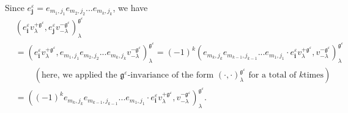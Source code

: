 \documentclass[etingof-lie.tex]{subfiles}
\begin{document}
Since $e_{\mathbf{j}}^{\varepsilon}=e_{m_{1},j_{1}}e_{m_{2},j_{2}}%
...e_{m_{k},j_{k}}$, we have%
\begin{align}
&  \left(  e_{\mathbf{i}}^{\varepsilon}v_{\lambda}^{+\mathfrak{g}%
^{\varepsilon}},e_{\mathbf{j}}^{\varepsilon}v_{-\lambda}^{-\mathfrak{g}%
^{\varepsilon}}\right)  _{\lambda}^{\mathfrak{g}^{\varepsilon}}\nonumber\\
&  =\left(  e_{\mathbf{i}}^{\varepsilon}v_{\lambda}^{+\mathfrak{g}%
^{\varepsilon}},e_{m_{1},j_{1}}e_{m_{2},j_{2}}...e_{m_{k},j_{k}}v_{-\lambda
}^{-\mathfrak{g}^{\varepsilon}}\right)  _{\lambda}^{\mathfrak{g}^{\varepsilon
}}=\left(  -1\right)  ^{k}\left(  e_{m_{k},j_{k}}e_{m_{k-1},j_{k-1}%
}...e_{m_{1},j_{1}}\cdot e_{\mathbf{i}}^{\varepsilon}v_{\lambda}%
^{+\mathfrak{g}^{\varepsilon}},v_{-\lambda}^{-\mathfrak{g}^{\varepsilon}%
}\right)  _{\lambda}^{\mathfrak{g}^{\varepsilon}}\nonumber\\
&  \ \ \ \ \ \ \ \ \ \ \left(  \text{here, we applied the }\mathfrak{g}%
^{\varepsilon}\text{-invariance of the form }\left(  \cdot,\cdot\right)
_{\lambda}^{\mathfrak{g}^{\varepsilon}}\text{ for a total of }k\text{
times}\right) \nonumber\\
&  =\left(  \left(  -1\right)  ^{k}e_{m_{k},j_{k}}e_{m_{k-1},j_{k-1}%
}...e_{m_{1},j_{1}}\cdot e_{\mathbf{i}}^{\varepsilon}v_{\lambda}%
^{+\mathfrak{g}^{\varepsilon}},v_{-\lambda}^{-\mathfrak{g}^{\varepsilon}%
}\right)  _{\lambda}^{\mathfrak{g}^{\varepsilon}}.
\label{pf.invformnondeg.polynomiality.1}%
\end{align}
\end{document}
